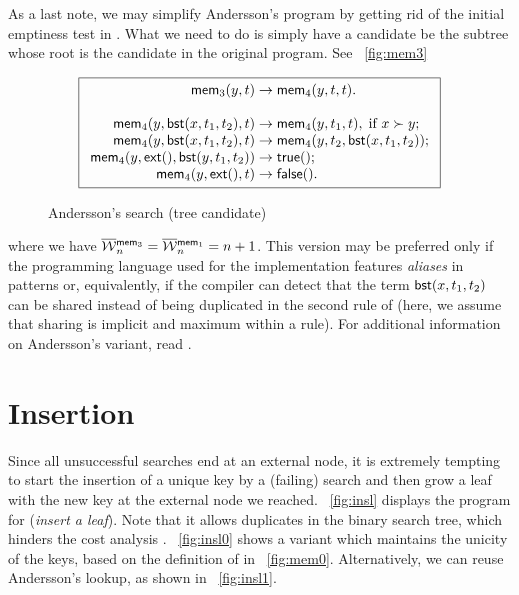 As a last note, we may simplify Andersson's program by getting rid of
the initial emptiness test in . What we need to do is
simply have a candidate be the subtree whose root is the candidate in
the original program. See \fig~\vref{fig:mem3}
\begin{figure}[b]
\begin{equation*}
\boxed{
\begin{array}{r@{\;}l@{\;}l}
  \fun{mem}_3(y,t) & \rightarrow & \fun{mem}_4(y,t,t).\\
  \\
  \fun{mem}_4(y,\fun{bst}(x,t_1,t_2),t) & \rightarrow &
  \fun{mem}_4(y,t_1,t),\; \text{if \(x \succ y\)};\\
\fun{mem}_4(y,\fun{bst}(x,t_1,t_2),t) & \rightarrow &
  \fun{mem}_4(y,t_2,\fun{bst}(x,t_1,t_2));\\
\fun{mem}_4(y,\fun{ext}(),\fun{bst}(y,t_1,t_2)) & \rightarrow & \fun{true}();\\
\fun{mem}_4(y,\fun{ext}(),t) & \rightarrow & \fun{false}().
\end{array}}
\end{equation*}
\caption{Andersson's search (tree candidate)\label{fig:mem3}}
\end{figure}
where we have \(\OW{\fun{mem}_3}{n} = \OW{\fun{mem}_1}{n} = n + 1\).
This version may be preferred only if the programming language used
for the implementation features \emph{aliases}
in patterns or, equivalently, if the compiler can detect that the term
\(\textsf{bst}(x,t_1,t_2)\) can be shared instead of being duplicated in
the second rule of  (here, we assume that sharing is
implicit and maximum within a rule). For
additional information on Andersson's variant, read
\cite{Spuler_1992}.


\section{Insertion}
\label{sec:bst:insertion}


Since all unsuccessful searches end at an external node, it is
extremely tempting to start the insertion of a unique key by a
(failing) search and then grow a leaf with the new key at the external
node we reached. \Fig~\vref{fig:insl} displays the program for
 (\emph{insert a leaf}). Note
that it allows duplicates in the binary search tree, which hinders the
cost analysis \citep{Burge_1976,ArchibaldClement_2006,Pasanen_2010}.
\Fig~\vref{fig:insl0} shows a variant which maintains the unicity of
the keys, based on the definition of
 in
\fig~\vref{fig:mem0}. Alternatively, we can reuse Andersson's lookup,
as shown in \fig~\vref{fig:insl1}.

